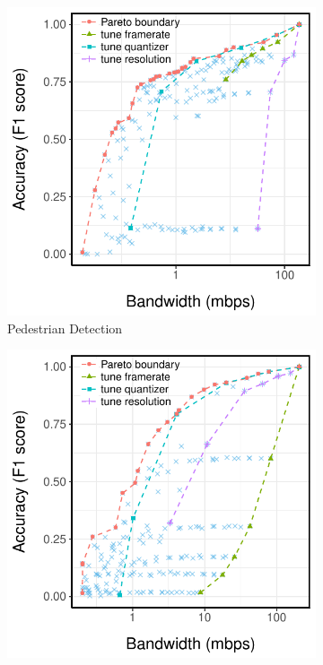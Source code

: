 \begin{figure}
  \centering
  \begin{subfigure}[t]{0.3\textwidth}
    \centering
    \includegraphics[width=\textwidth]{figures/ped-profile.pdf}
    \caption{Pedestrian Detection}
    \label{fig:pd-profile}
  \end{subfigure}
  \hfill
  \begin{subfigure}[t]{0.3\textwidth}
    \centering
    \includegraphics[width=\textwidth]{figures/darknet-profile.pdf}

\end{subfigure}
\end{figure}
